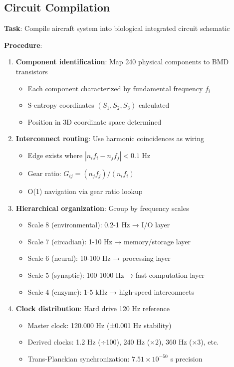 \documentclass[11pt,a4paper]{article}
\begin{document}
\subsection{Circuit Compilation}

\textbf{Task}: Compile aircraft system into biological integrated circuit schematic

\textbf{Procedure}:
\begin{enumerate}
\item \textbf{Component identification}: Map 240 physical components to BMD transistors
\begin{itemize}
\item Each component characterized by fundamental frequency $f_i$
\item S-entropy coordinates $(S_1, S_2, S_3)$ calculated
\item Position in 3D coordinate space determined
\end{itemize}

\item \textbf{Interconnect routing}: Use harmonic coincidences as wiring
\begin{itemize}
\item Edge exists where $|n_i f_i - n_j f_j| < 0.1$ Hz
\item Gear ratio: $G_{ij} = (n_j f_j) / (n_i f_i)$
\item O(1) navigation via gear ratio lookup
\end{itemize}

\item \textbf{Hierarchical organization}: Group by frequency scales
\begin{itemize}
\item Scale 8 (environmental): 0.2-1 Hz → I/O layer
\item Scale 7 (circadian): 1-10 Hz → memory/storage layer
\item Scale 6 (neural): 10-100 Hz → processing layer
\item Scale 5 (synaptic): 100-1000 Hz → fast computation layer
\item Scale 4 (enzyme): 1-5 kHz → high-speed interconnects
\end{itemize}

\item \textbf{Clock distribution}: Hard drive 120 Hz reference
\begin{itemize}
\item Master clock: 120.000 Hz (±0.001 Hz stability)
\item Derived clocks: 1.2 Hz (÷100), 240 Hz (×2), 360 Hz (×3), etc.
\item Trans-Planckian synchronization: $7.51\times10^{-50}$ s precision
\end{itemize}


\end{enumerate}
\end{document}
